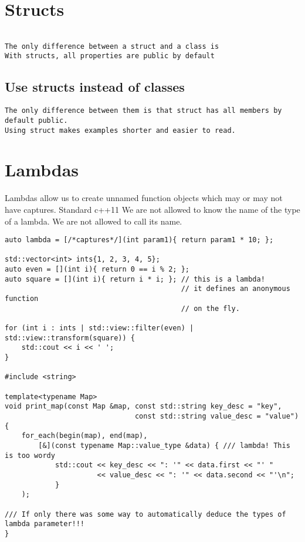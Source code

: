\section{Structs}
\begin{verbatim}

The only difference between a struct and a class is
With structs, all properties are public by default
\end{verbatim}

\subsection{Use structs instead of classes}
\begin{verbatim}
The only difference between them is that struct has all members by default public.
Using struct makes examples shorter and easier to read. 
\end{verbatim}

\section{Lambdas}

Lambdas allow us to create unnamed function objects which may or may not have captures.
Standard c++11
We are not allowed to know the name of the type of a lambda. We are not allowed to call its name.

\begin{verbatim}
auto lambda = [/*captures*/](int param1){ return param1 * 10; };

std::vector<int> ints{1, 2, 3, 4, 5};
auto even = [](int i){ return 0 == i % 2; };
auto square = [](int i){ return i * i; }; // this is a lambda!
                                          // it defines an anonymous function
                                          // on the fly.

for (int i : ints | std::view::filter(even) | std::view::transform(square)) {
    std::cout << i << ' ';
}

#include <string>

template<typename Map>
void print_map(const Map &map, const std::string key_desc = "key",
                               const std::string value_desc = "value")
{
    for_each(begin(map), end(map),
        [&](const typename Map::value_type &data) { /// lambda! This is too wordy
            std::cout << key_desc << ": '" << data.first << "' "
                      << value_desc << ": '" << data.second << "'\n";
            }
    );

/// If only there was some way to automatically deduce the types of lambda parameter!!!
}
\end{verbatim}

